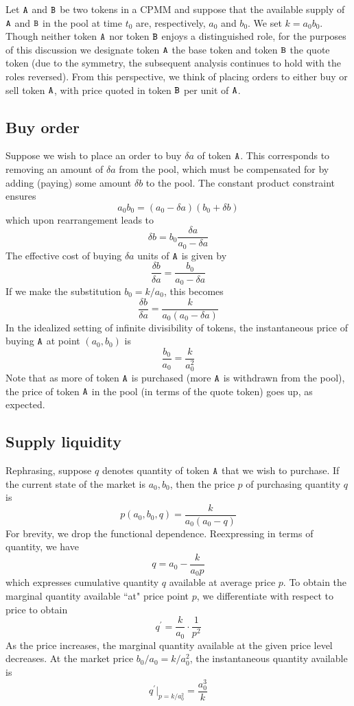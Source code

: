 \documentclass[11pt, reqno]{amsart}
\theoremstyle{definition}
\theoremstyle{remark}
\newcommand{\tA}{\textnormal{\texttt{A}}}
\newcommand{\tB}{\textnormal{\texttt{B}}}
\begin{document}
Let $\tA$ and $\tB$ be two tokens in a CPMM and suppose that the available
supply of $\tA$ and $\tB$ in the pool at time $t_0$ are, respectively,
$a_0$ and $b_0$. We set $k = a_0 b_0$. Though neither token $\tA$ nor token
$\tB$ enjoys a distinguished role, for the purposes of this discussion we
designate token $\tA$ the base token and token $\tB$ the quote token
(due to the symmetry, the subsequent analysis continues to hold with the roles
reversed). From this perspective, we think of placing orders to either buy or
sell token $\tA$, with price quoted in token $\tB$ per unit of $\tA$.

\subsection{Buy order}

Suppose we wish to place an order to buy $\delta a$ of token $\tA$. This
corresponds to removing an amount of $\delta a$ from the pool, which must
be compensated for by adding (paying) some amount $\delta b$ to the pool.
The constant product constraint ensures
\[
	a_0 b_0 = (a_0 - \delta a) (b_0 + \delta b)
\]
which upon rearrangement leads to
\[
	\delta b = b_0 \frac{\delta a}{a_0 - \delta a}
\]
The effective cost of buying $\delta a$ units of $\tA$ is given by
\[
	\frac{\delta b}{\delta a} = \frac{b_0}{a_0 - \delta a}
\]
If we make the substitution $b_0 = k / a_0$, this becomes
\[
	\frac{\delta b}{\delta a} = \frac{k}{a_0(a_0 - \delta a)}
\]
In the idealized setting of infinite divisibility of tokens, the
instantaneous price of buying $\tA$ at point $(a_0, b_0)$ is
\[
	\frac{b_0}{a_0} = \frac{k}{a_0^2}
\]
Note that as more of token $\tA$ is purchased (more $\tA$ is withdrawn from
the pool), the price of token $\tA$ in the pool (in terms of the quote token)
goes up, as expected.

\subsection{Supply liquidity}

Rephrasing, suppose $q$ denotes quantity of token $\tA$ that we wish to
purchase. If the current state of the market is $a_0, b_0$, then the price $p$
of purchasing quantity $q$ is
\[
	p(a_0, b_0, q) = \frac{k}{a_0 (a_0 - q)}
\]
For brevity, we drop the functional dependence. Reexpressing in
terms of quantity, we have
\[
	q = a_0 - \frac{k}{a_0 p}
\]
which expresses cumulative quantity $q$ available at average price $p$.
To obtain the marginal quantity available ``at" price point $p$, we
differentiate with respect to price to obtain
\[
	q^\prime = \frac{k}{a_0} \cdot \frac{1}{p^2}
\]
As the price increases, the marginal quantity available at the given price
level decreases.
At the market price $b_0 / a_0 = k / a_0^2$, the instantaneous quantity
available is
\[
	q^\prime|_{p = k / a_0^2} = \frac{a_0^3}{k}
\]
\end{document}
